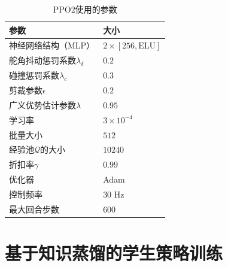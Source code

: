 \begin{table}[H]
    \caption{\label{tab:PPO-hyper-param}PPO2使用的参数}
    \renewcommand{\arraystretch}{1.25}
    \begin{tabularx}{\linewidth}{X<{\centering} X<{\centering}}
        \toprule[2pt]
        参数 & 大小 \\ \midrule[1pt]
        神经网络结构（MLP） & $2\times [256, \text{ELU}]$ \\
        舵角抖动惩罚系数$\lambda_\delta$ & $0.2$ \\
        碰撞惩罚系数$\lambda_c$ & $0.3$ \\
        剪裁参数$\epsilon$ & $0.2$ \\
        广义优势估计参数$\lambda$ & $0.95$ \\
        学习率 & $3\times 10^{-4}$ \\
        批量大小 & $512$ \\
        经验池$\mathcal{Q}$的大小 & $10240$ \\
        折扣率$\gamma$ & $0.99$ \\
        优化器 & Adam \\
        控制频率 & $30 \text{ Hz}$ \\
        最大回合步数 & $600$ \\ \bottomrule[2pt]
    \end{tabularx}
\end{table}

\section{基于知识蒸馏的学生策略训练}
